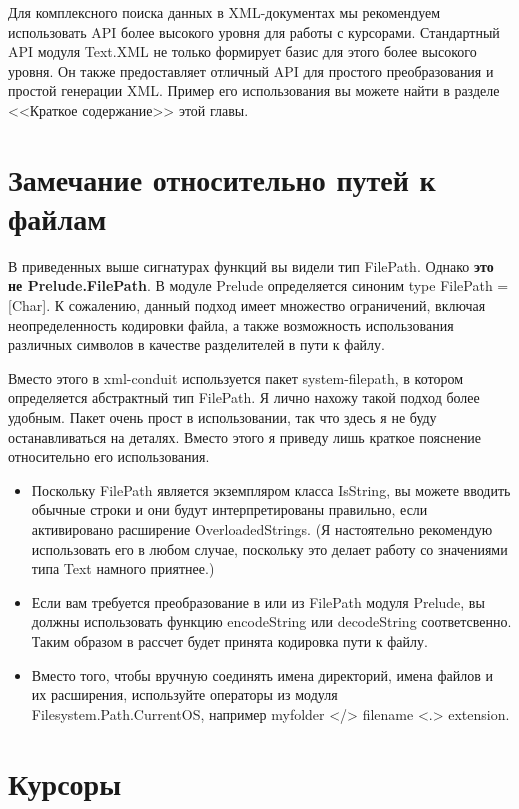 Для комплексного поиска данных в XML-документах мы рекомендуем использовать API более высокого уровня для работы с курсорами. Стандартный API модуля Text.XML не только формирует базис для этого более высокого уровня. Он также предоставляет отличный API для простого преобразования и простой генерации XML. Пример его использования вы можете найти в разделе <<Краткое содержание>> этой главы.

\section{Замечание относительно путей к файлам} %

В приведенных выше сигнатурах функций вы видели тип FilePath. Однако {\bf это не Prelude.FilePath}. В модуле Prelude определяется синоним type FilePath = [Char]. К сожалению, данный подход имеет множество ограничений, включая неопределенность кодировки файла, а также возможность использования различных символов в качестве разделителей в пути к файлу.

Вместо этого в xml-conduit используется пакет system-filepath, в котором определяется абстрактный тип FilePath. Я лично нахожу такой подход более удобным. Пакет очень прост в использовании, так что здесь я не буду останавливаться на деталях. Вместо этого я приведу лишь краткое пояснение относительно его использования.

\begin{itemize}
\item Поскольку FilePath является экземпляром класса IsString, вы можете вводить обычные строки и они будут интерпретированы правильно, если активировано расширение OverloadedStrings. (Я настоятельно рекомендую использовать его в любом случае, поскольку это делает работу со значениями типа Text намного приятнее.)
\item Если вам требуется преобразование в или из FilePath модуля Prelude, вы должны использовать функцию encodeString или decodeString соответсвенно. Таким образом в рассчет будет принята кодировка пути к файлу.
\item Вместо того, чтобы вручную соединять имена директорий, имена файлов и их расширения, используйте операторы из модуля Filesystem.Path.CurrentOS, например myfolder </> filename <.> extension.
\end{itemize}
  
\section{Курсоры} %

